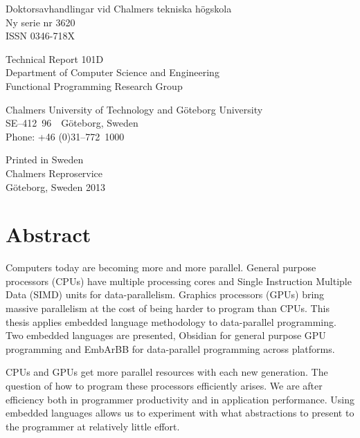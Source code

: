 \documentclass[a4paper]{book}
\newcommand{\dept}{Department of Computer Science and Engineering}
\newcommand{\uni}{Chalmers University of Technology and G\"oteborg University}
\newcommand{\group}{Functional Programming Research Group}
\begin{document}
\noindent Doktorsavhandlingar vid Chalmers tekniska högskola \\
\noindent Ny serie nr 3620 \\
\noindent ISSN 0346-718X \\

\vspace{1cm}

\noindent Technical Report 101D\\
\noindent \dept \\
\noindent \group\\

\vspace{1cm} 

\noindent \uni \\
\noindent SE--412~96~~G\"oteborg, Sweden\\
\noindent Phone: +46 (0)31--772~1000 \\

\vspace{1cm} 

\noindent Printed in Sweden\\
\noindent Chalmers Reproservice\\
\noindent G\"oteborg, Sweden 2013


\thispagestyle{empty}

\clearpage
{}

\section*{Abstract}

Computers today are becoming more and more parallel. General purpose processors (CPUs) 
have multiple processing cores and Single Instruction Multiple Data (SIMD) units for 
data-parallelism. Graphics processors (GPUs) bring massive parallelism at the cost of 
being harder to program than CPUs. This thesis applies embedded language methodology 
to data-parallel programming. Two embedded languages are presented, Obsidian for general 
purpose GPU programming and EmbArBB for data-parallel programming across platforms. 

CPUs and GPUs get more parallel resources with each new generation. The question of how to 
program these processors efficiently arises. We are after efficiency both in programmer 
productivity and in application performance. Using embedded languages allows us to experiment
with what abstractions to present to the programmer at relatively little effort.
\end{document}

